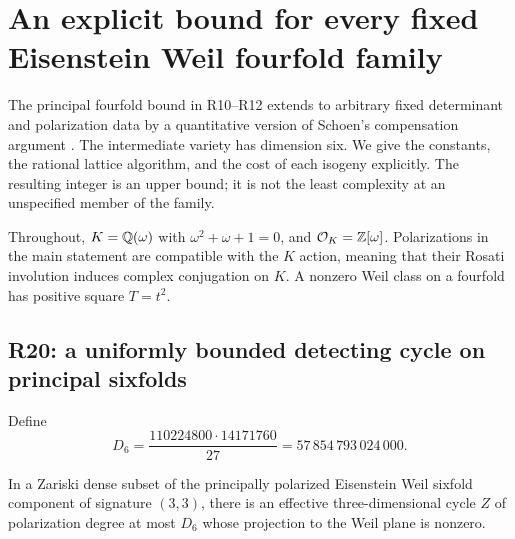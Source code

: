 \section{An explicit bound for every fixed Eisenstein Weil fourfold family}
\label{sec:sixfold-extension}

The principal fourfold bound in R10--R12 extends to arbitrary fixed determinant and polarization data by a quantitative version of Schoen's compensation argument \cite[Proposition 10]{Schoen1998}. The intermediate variety has dimension six. We give the constants, the rational lattice algorithm, and the cost of each isogeny explicitly. The resulting integer is an upper bound; it is not the least complexity at an unspecified member of the family.

Throughout, $K=\mathbb Q(\omega)$ with $\omega^2+\omega+1=0$, and $\mathcal O_K=\mathbb Z[\omega]$. Polarizations in the main statement are compatible with the $K$ action, meaning that their Rosati involution induces complex conjugation on $K$. A nonzero Weil class on a fourfold has positive square $T=t^2$.

\subsection{R20: a uniformly bounded detecting cycle on principal sixfolds}

Define
\begin{equation}
D_6=\frac{110224800\cdot14171760}{27}
=57\,854\,793\,024\,000.
\label{eq:D6}
\end{equation}

\begin{proposition}[R20]
\label{prop:R20}
In a Zariski dense subset of the principally polarized Eisenstein Weil sixfold component of signature $(3,3)$, there is an effective three-dimensional cycle $Z$ of polarization degree at most $D_6$ whose projection to the Weil plane is nonzero.
\end{proposition}


